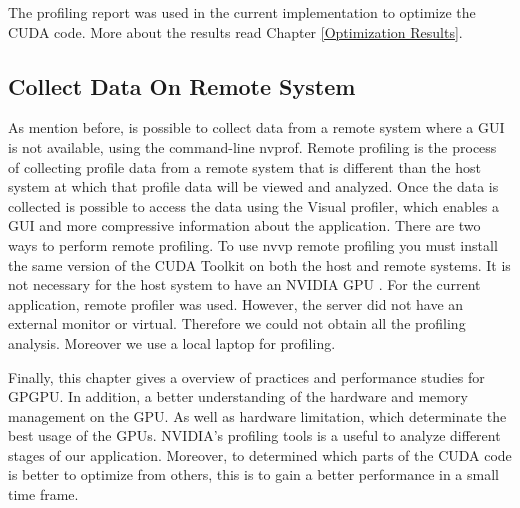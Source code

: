 The profiling report was used in the current implementation to optimize the CUDA code. More about the results read Chapter \ref{Optimization Results}.

\subsection{Collect Data On Remote System}

As mention before, is possible to collect data from a remote system where a GUI is not available, using the command-line nvprof. Remote profiling is the process of collecting profile data from a remote system that is different than the host system at which that profile data will be viewed and analyzed. Once the data is collected is possible to access the data using the Visual profiler, which enables a GUI and more compressive information about the application. There are two ways to perform remote profiling. To use nvvp remote profiling you must install the same version of the CUDA Toolkit on both the host and remote systems. It is not necessary for the host system to have an NVIDIA GPU \cite{tool}. For the current application, remote profiler was used. However, the server did not have an external monitor or virtual. Therefore we could not obtain all the profiling analysis. Moreover we use a local laptop for profiling.

\vspace{3.2em}

Finally, this chapter gives a overview of practices and performance studies for GPGPU. In addition, a better understanding of the hardware and memory management on the GPU. As well as hardware limitation, which determinate the best usage of the GPUs. NVIDIA's profiling tools is a useful to analyze different stages of our application. Moreover, to determined which parts of the CUDA code is better to optimize from others, this is to gain a better performance in a small time frame.


